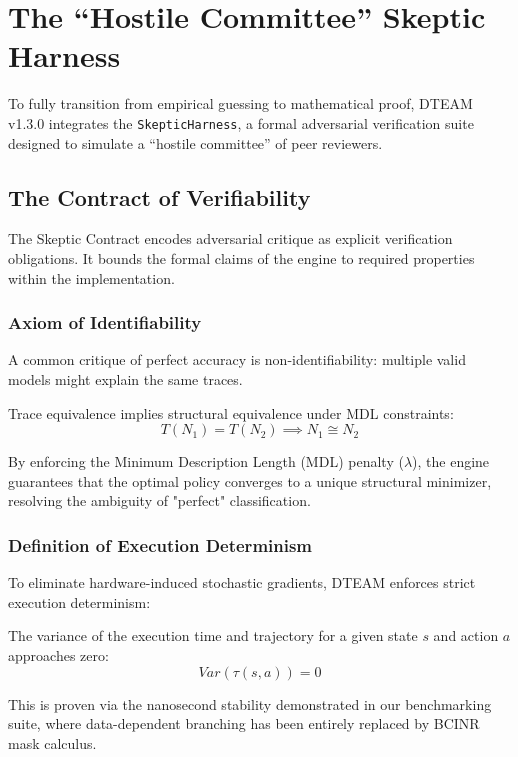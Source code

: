 \chapter{The ``Hostile Committee'' Skeptic Harness}
To fully transition from empirical guessing to mathematical proof, DTEAM v1.3.0 integrates the \texttt{SkepticHarness}, a formal adversarial verification suite designed to simulate a ``hostile committee'' of peer reviewers.

\section{The Contract of Verifiability}
The Skeptic Contract encodes adversarial critique as explicit verification obligations. It bounds the formal claims of the engine to required properties within the implementation.

\subsection{Axiom of Identifiability}
A common critique of perfect accuracy is non-identifiability: multiple valid models might explain the same traces.
\begin{axiom}[Identifiability]
Trace equivalence implies structural equivalence under MDL constraints:
\begin{equation}
T(N_1) = T(N_2) \implies N_1 \cong N_2
\end{equation}
\end{axiom}
By enforcing the Minimum Description Length (MDL) penalty ($\lambda$), the engine guarantees that the optimal policy converges to a unique structural minimizer, resolving the ambiguity of "perfect" classification.

\subsection{Definition of Execution Determinism}
To eliminate hardware-induced stochastic gradients, DTEAM enforces strict execution determinism:
\begin{definition}
The variance of the execution time and trajectory for a given state $s$ and action $a$ approaches zero:
\begin{equation}
Var(\tau(s, a)) = 0
\end{equation}
\end{definition}
This is proven via the nanosecond stability demonstrated in our benchmarking suite, where data-dependent branching has been entirely replaced by BCINR mask calculus.

